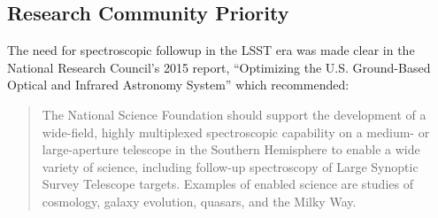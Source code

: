 \documentclass[oneside,11pt]{amsart}
\newcommand{\comment}[2][todo]{{\color{#1}[[{\bf #2}]]}}
\begin{document}






\subsection{Research Community Priority} 
\label{sec:community}



The need for spectroscopic followup in the LSST era was made clear in the National Research Council's 2015 report, ``Optimizing the U.S. Ground-Based Optical and Infrared Astronomy System'' \citep{NAP21722} which recommended:

\begin{quote}
The National Science Foundation should support the development of a wide-field, highly multiplexed spectroscopic capability on a medium- or large-aperture telescope in the Southern Hemisphere to enable a wide variety of science, including follow-up spectroscopy of Large Synoptic Survey Telescope targets. Examples of enabled science are studies of cosmology, galaxy evolution, quasars, and the Milky Way.
\end{quote}
\end{document}
